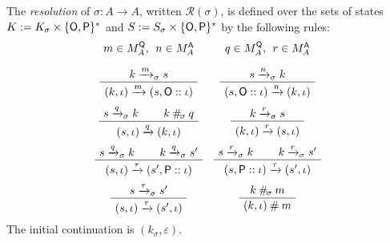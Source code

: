 \begin{definition} %
The \emph{resolution} of $\sigma : A \rightarrow A$,
written $\mathcal{R}(\sigma)$,
is defined over the sets of states
$K := K_\sigma \times \{ \mathsf{O} ,  \mathsf{P} \}^*$ and
$S := S_\sigma \times \{ \mathsf{O} ,  \mathsf{P} \}^*$
by the following rules:
\[
  \begin{array}{cc}
    {\small m \in M_A^\kw{Q}, \:\: n \in M_A^\kw{A}}
    &
    {\small q \in M_A^\kw{Q}, \:\: r \in M_A^\kw{A}}
    \\[1em]
    \AxiomC{$k \xrightarrow{m}_\sigma s$}
    \UnaryInfC{$(k, \iota) \xrightarrow{m} (s, \kw{O} :: \iota)$}
    \DisplayProof
    &
    \AxiomC{$s \xrightarrow{n}_\sigma k$}
    \UnaryInfC{$(s, \kw{O} :: \iota) \xrightarrow{n} (k, \iota)$}
    \DisplayProof
    \\[1.5em]
    \AxiomC{$s \xrightarrow{q}_\sigma k$}
    \AxiomC{$k \:\#_{\!\sigma}\: q$}
    \BinaryInfC{$(s, \iota) \xrightarrow{q} (k, \iota)$}
    \DisplayProof
    &
    \AxiomC{$k \xrightarrow{r}_\sigma s$}
    \UnaryInfC{$(k, \iota) \xrightarrow{r} (s, \iota)$}
    \DisplayProof
    \\[1.5em]
    \AxiomC{$s \xrightarrow{q}_\sigma k$}
    \AxiomC{$k \xrightarrow{q}_\sigma s'$}
    \BinaryInfC{$(s, \iota) \xrightarrow{\tau} (s', \kw{P} :: \iota)$}
    \DisplayProof
    &
    \AxiomC{$s \xrightarrow{r}_\sigma k$}
    \AxiomC{$k \xrightarrow{r}_\sigma s'$}
    \BinaryInfC{$(s, \kw{P} :: \iota) \xrightarrow{\tau} (s', \iota)$}
    \DisplayProof
    \\[1.5em]
    \AxiomC{$s \xrightarrow{\tau}_\sigma s'$}
    \UnaryInfC{$(s, \iota) \xrightarrow{\tau} (s', \iota)$}
    \DisplayProof
    &
    \AxiomC{$k \:\#_{\!\sigma}\: m$}
    \UnaryInfC{$(k, \iota) \:\#\: m$}
    \DisplayProof
  \end{array}
\]
The initial continuation is $(k_{\sigma}, \varepsilon)$.
\end{definition}

